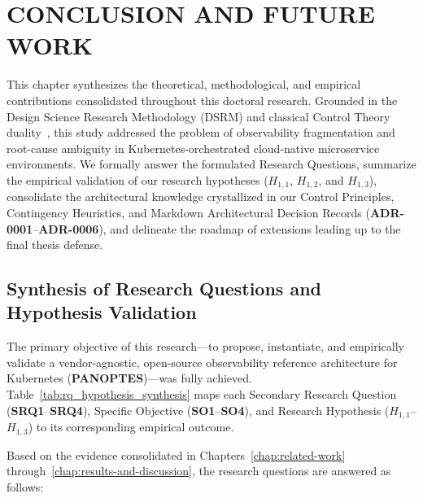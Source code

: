 \chapter{CONCLUSION AND FUTURE WORK}
\label{chap:conclusion}

This chapter synthesizes the theoretical, methodological, and empirical contributions consolidated throughout this doctoral research. Grounded in the Design Science Research Methodology (DSRM) \cite{peffers_2006, hevner_2004} and classical Control Theory duality~\cite{kalman_1959}, this study addressed the problem of observability fragmentation and root-cause ambiguity in Kubernetes-orchestrated cloud-native microservice environments. We formally answer the formulated Research Questions, summarize the empirical validation of our research hypotheses ($H_{1,1}$, $H_{1,2}$, and $H_{1,3}$), consolidate the architectural knowledge crystallized in our Control Principles, Contingency Heuristics, and Markdown Architectural Decision Records (\textbf{ADR-0001}--\textbf{ADR-0006}), and delineate the roadmap of extensions leading up to the final thesis defense.

\section{Synthesis of Research Questions and Hypothesis Validation}
\label{sec:conclusion-synthesis}

The primary objective of this research---to propose, instantiate, and empirically validate a vendor-agnostic, open-source observability reference architecture for Kubernetes (\textbf{PANOPTES})---was fully achieved. Table~\ref{tab:rq_hypothesis_synthesis} maps each Secondary Research Question (\textbf{SRQ1}--\textbf{SRQ4}), Specific Objective (\textbf{SO1}--\textbf{SO4}), and Research Hypothesis ($H_{1,1}$--$H_{1,3}$) to its corresponding empirical outcome.



Based on the evidence consolidated in Chapters~\ref{chap:related-work} through~\ref{chap:results-and-discussion}, the research questions are answered as follows:

